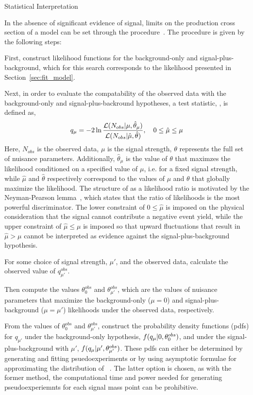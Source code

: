 \begin{section}{Statistical Interpretation}

In the absence of significant evidence of signal, limits on the production cross section of a model can be set through the \CLs procedure~\cite{0954-3899-28-10-313,CMS-NOTE-2011-005,Junk:1999kv}.
The procedure is given by the following steps:

First, construct likelihood functions for the background-only and signal-plus-background, which for this search corresponds to the likelihood presented in Section~\ref{sec:fit_model}.

Next, in order to evaluate the compatability of the observed data with the background-only and signal-plus-backround hypotheses, a test statistic, \qu, is defined as,
\begin{align}
q_{\mu} = -2\ln \frac{\mathcal{L}(N_{obs}|\mu,\hat{\theta}_{\mu})}{\mathcal{L}(N_{obs}|\hat{\mu},\hat{\theta})}, \quad  0 \leq \hat{\mu} \leq \mu
\end{align}
Here, $N_{obs}$ is the observed data, $\mu$ is the signal strength, $\theta$ represents the full set of nuisance parameters.
Additionally, $\hat{\theta}_{\mu}$ is the value of $\theta$ that maximzes the likelihood conditioned on a specified value of $\mu$, i.e. for a fixed signal strength, while $\hat{\mu}$ and $\hat{\theta}$ respectively correspond to the values of $\mu$ and $\theta$ that globally maximize the likelihood.
The structure of \qu as a likelihood ratio is motivated by the Neyman-Pearson lemma~\cite{Neyman289}, which states that the ratio of likelihoods is the most powerful discriminator.
The lower constraint of $0 \leq \hat{\mu}$ is imposed on the physical consideration that the signal cannot contribute a negative event yield, while the upper constraint of $\hat{\mu} \leq \mu$ is imposed so that upward fluctuations that result in $\hat{\mu} > \mu$ cannot be interpreted as evidence against the signal-plus-background hypothesis.

For some choice of signal strength, $\mu'$, and the observed data, calculate the observed value of $q^{obs}_{\mu'}$.

Then compute the values $\theta^{obs}_{0}$ and $\theta^{obs}_{\mu'}$, which are the values of nuisance parameters that maximize the background-only ($\mu = 0$) and signal-plus-background ($\mu = \mu'$) likelihoods under the observed data, respectively.

From the values of $\theta^{obs}_{0}$ and $\theta^{obs}_{\mu'}$, construct the probability density functions (pdfs) for $q_{\mu'}$ under the background-only hypothesis, $f(q_{\mu}|0,\theta^{obs}_{0})$, and under the signal-plus-background with $\mu'$, $f(q_{\mu}|\mu',\theta^{obs}_{\mu'})$.
These pdfs can either be determined by generating and fitting psuedoexperiments or by using asymptotic formulae for approximating the distribution of \qu~\cite{Cowan:2010js}.
The latter option is chosen, as with the former method, the computational time and power needed for generating pseudoexperiemnts for each signal mass point can be prohibitive.


\end{section}
